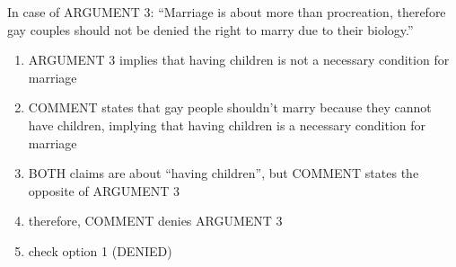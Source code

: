 \noindent In case of ARGUMENT 3: ``Marriage is about more than procreation, therefore gay
couples should not be denied the right to marry due to their biology.''

\begin{enumerate}
\item ARGUMENT 3 implies that having children is not a necessary condition for marriage
\item COMMENT states that gay people shouldn’t marry because they cannot have children, implying that having children is a necessary condition for marriage
\item BOTH claims are about ``having children'', but COMMENT states the opposite of ARGUMENT 3
\item therefore, COMMENT denies ARGUMENT 3
\item check option 1 (DENIED)
\end{enumerate}
